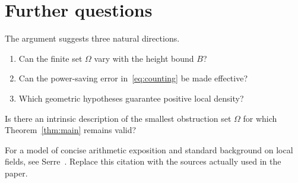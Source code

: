 \section{Further questions}\label{sec:questions}

The argument suggests three natural directions.

\begin{enumerate}
  \item Can the finite set $\Omega$ vary with the height bound $B$?
  \item Can the power-saving error in~\eqref{eq:counting} be made effective?
  \item Which geometric hypotheses guarantee positive local density?
\end{enumerate}

\begin{question}
Is there an intrinsic description of the smallest obstruction set $\Omega$
for which Theorem~\ref{thm:main} remains valid?
\end{question}

For a model of concise arithmetic exposition and standard background on local
fields, see Serre~\cite{serre-local-fields}. Replace this citation with the
sources actually used in the paper.
